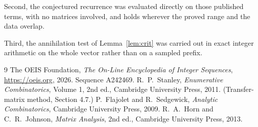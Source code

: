 \documentclass[11pt,a4paper]{article}
\theoremstyle{plain}
\theoremstyle{definition}
\begin{document}
Second, the conjectured recurrence was evaluated directly on those published terms, with no
matrices involved, and holds wherever the proved range and the data overlap.

Third, the annihilation test of Lemma~\ref{lem:crit} was carried out in exact integer
arithmetic on the whole vector rather than on a sampled prefix.

\begin{thebibliography}{9}
 The OEIS Foundation, \emph{The On-Line Encyclopedia of Integer
Sequences}, \url{https://oeis.org}, 2026. Sequence A242469.
 R.~P.~Stanley, \emph{Enumerative Combinatorics}, Volume 1, 2nd ed.,
Cambridge University Press, 2011. (Transfer-matrix method, Section 4.7.)
 P.~Flajolet and R.~Sedgewick, \emph{Analytic Combinatorics}, Cambridge
University Press, 2009.
 R.~A.~Horn and C.~R.~Johnson, \emph{Matrix Analysis}, 2nd ed., Cambridge
University Press, 2013.
\end{thebibliography}
\end{document}
